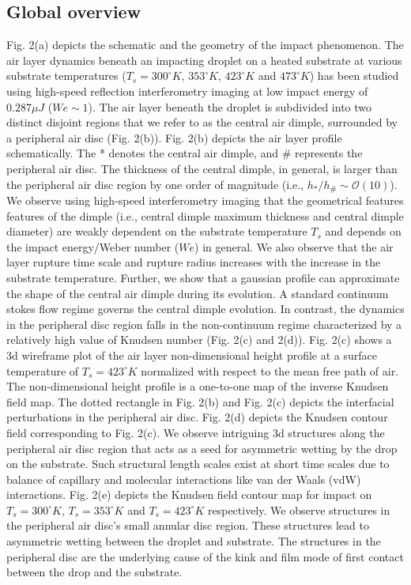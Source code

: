 \documentclass{jfm}
\begin{document}
\subsection{Global overview}
Fig. 2(a) depicts the schematic and the geometry of the impact phenomenon. The air layer dynamics beneath an impacting droplet on a heated substrate at various substrate temperatures ($T_s=300^{\circ}K$, $353^{\circ}K$, $423^{\circ}K$ and $473^{\circ}K$) has been studied using high-speed reflection interferometry imaging at low impact energy of $0.287{\mu}J$ ($We{\sim}1$). 
The air layer beneath the droplet is subdivided into two distinct disjoint regions that we refer to as the central air dimple, surrounded by a peripheral air disc (Fig. 2(b)). Fig. 2(b) depicts the air layer profile schematically. The * denotes the central air dimple, and \# represents the peripheral air disc. The thickness of the central dimple, in general, is larger than the peripheral air disc region by one order of magnitude (i.e., $h_{*}/h_{\#}{\sim}\mathcal{O}(10)$). We observe using high-speed interferometry imaging that the geometrical features features of the dimple (i.e., central dimple maximum thickness and central dimple diameter) are weakly dependent on the substrate temperature $T_s$ and depends on the impact energy/Weber number ($We$) in general. We also observe that the air layer rupture time scale and rupture radius increases with the increase in the substrate temperature. 
Further, we show that a gaussian profile can approximate the shape of the central air dimple during its evolution. A standard continuum stokes flow regime governs the central dimple evolution. In contrast, the dynamics in the peripheral disc region falls in the non-continuum regime characterized by a relatively high value of Knudsen number (Fig. 2(c) and 2(d)). Fig. 2(c) shows a 3d wireframe plot of the air layer non-dimensional height profile at a surface temperature of $T_s=423^{\circ}K$ normalized with respect to the mean free path of air. The non-dimensional height profile is a one-to-one map of the inverse Knudsen field map. The dotted rectangle in Fig. 2(b) and Fig. 2(c) depicts the interfacial perturbations in the peripheral air disc. Fig. 2(d) depicts the Knudsen contour field corresponding to Fig. 2(c). We observe intriguing 3d structures along the peripheral air disc region that acts as a seed for asymmetric wetting by the drop on the substrate. Such structural length scales exist at short time scales due to balance of capillary and molecular interactions like van der Waals (vdW) interactions. Fig. 2(e) depicts the Knudsen field contour map for impact on $T_s=300^{\circ}K$, $T_s=353^{\circ}K$ and $T_s=423^{\circ}K$ respectively. We observe structures in the peripheral air disc's small annular disc region. These structures lead to asymmetric wetting between the droplet and substrate. The structures in the peripheral disc are the underlying cause of the kink and film mode of first contact between the drop and the substrate. 
\end{document}
